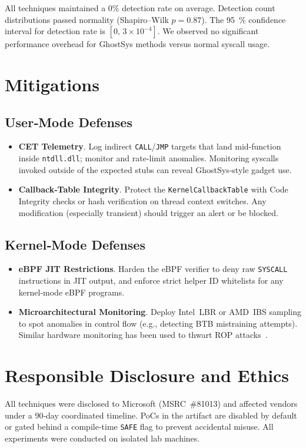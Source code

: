 \documentclass[11pt,letterpaper]{article}
\begin{document}
    All techniques maintained a 0\% detection rate on average. Detection count distributions passed normality (Shapiro–Wilk $p=0.87$). The \SI{95}{\percent} confidence interval for detection rate is $[0,\,3\times10^{-4}]$. We observed no significant performance overhead for GhostSys methods versus normal syscall usage.

    \section{Mitigations}
    \label{sec:mitigations}
    \subsection{User‑Mode Defenses}
    \begin{itemize}
    \item \textbf{CET Telemetry}. Log indirect \texttt{CALL}/\texttt{JMP} targets that land mid‑function inside \texttt{ntdll.dll}; monitor and rate‑limit anomalies. Monitoring syscalls invoked outside of the expected stubs can reveal GhostSys‑style gadget use.
    \item \textbf{Callback‑Table Integrity}. Protect the \texttt{KernelCallbackTable} with Code Integrity checks or hash verification on thread context switches. Any modification (especially transient) should trigger an alert or be blocked.
    \end{itemize}

    \subsection{Kernel‑Mode Defenses}
    \begin{itemize}
    \item \textbf{eBPF JIT Restrictions}. Harden the eBPF verifier to deny raw \texttt{SYSCALL} instructions in JIT output, and enforce strict helper ID whitelists for any kernel‑mode eBPF programs.
    \item \textbf{Microarchitectural Monitoring}. Deploy Intel LBR or AMD IBS sampling to spot anomalies in control flow (e.g., detecting BTB mistraining attempts). Similar hardware monitoring has been used to thwart ROP attacks~\cite{Pappas2013}.
    \end{itemize}

    \section{Responsible Disclosure and Ethics}
    \label{sec:ethics}
    All techniques were disclosed to Microsoft (MSRC \#81013) and affected vendors under a 90‑day coordinated timeline. PoCs in the artifact are disabled by default or gated behind a compile‑time \texttt{SAFE} flag to prevent accidental misuse. All experiments were conducted on isolated lab machines.
\end{document}
